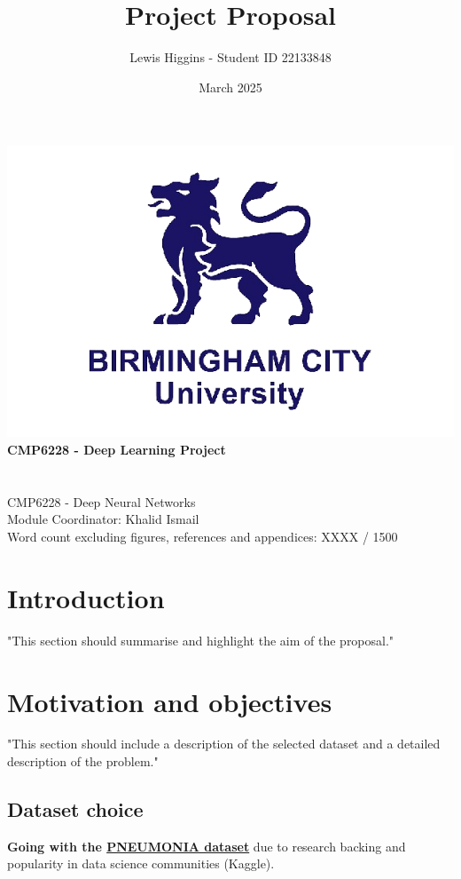 \documentclass[12pt]{report}
\title{Project Proposal}
\author{Lewis Higgins - Student ID 22133848}
\date{March 2025}
\begin{document}
\makeatletter
\begin{titlepage}
    \begin{center}
        \includegraphics[width=0.7\linewidth]{BCU}\\[4ex]
        {\huge \bfseries CMP6228 - Deep Learning Project}\\[2ex]
        {\large \bfseries  \@title}\\[50ex]
        {\@author}\\[2ex]
        {CMP6228 - Deep Neural Networks}\\[2ex]
        {Module Coordinator: Khalid Ismail}\\[2ex]
        {Word count excluding figures, references and appendices: XXXX / 1500}\\[10ex]
    \end{center}
\end{titlepage}
\makeatother
\thispagestyle{empty}
\newpage

\setcounter{page}{0}

\tableofcontents
\thispagestyle{empty}

\chapter*{Introduction}
"This section should summarise and highlight the aim of
the proposal."


\chapter{Motivation and objectives}
"This section should include a description
of the selected dataset and a detailed description of the problem."

\section{Dataset choice}
\textbf{Going with the 
\href{https://data.mendeley.com/datasets/rscbjbr9sj/3}{PNEUMONIA dataset}} 
due to research backing and popularity in data science 
communities (Kaggle).
\end{document}
